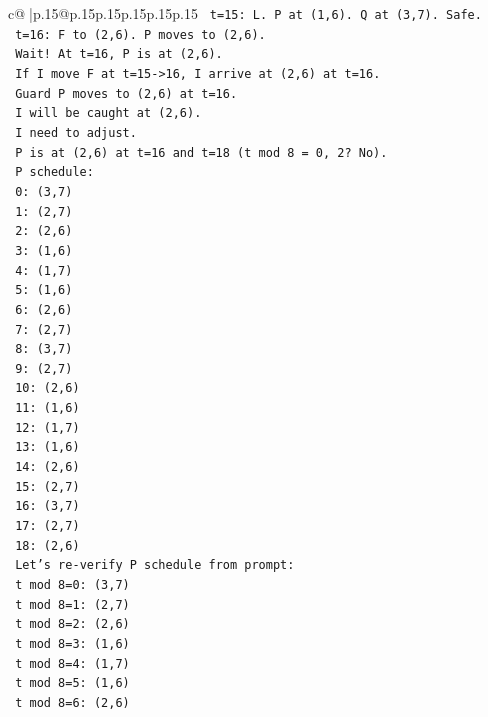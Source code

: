 \documentclass{article}
\begin{document}
{\begin{supertabular}{c@{$\;$}|p{.15\linewidth}@{}p{.15\linewidth}p{.15\linewidth}p{.15\linewidth}p{.15\linewidth}p{.15\linewidth}}
{{{\texttt{   t=15: L. P at (1,6). Q at (3,7). Safe.} \\
\texttt{   t=16: F to (2,6). P moves to (2,6).} \\
\texttt{     Wait! At t=16, P is at (2,6).} \\
\texttt{     If I move F at t=15{-}>16, I arrive at (2,6) at t=16.} \\
\texttt{     Guard P moves to (2,6) at t=16.} \\
\texttt{     I will be caught at (2,6).} \\
\texttt{   I need to adjust.} \\
\texttt{   P is at (2,6) at t=16 and t=18 (t mod 8 = 0, 2? No).} \\
\texttt{   P schedule:} \\
\texttt{   0: (3,7)} \\
\texttt{   1: (2,7)} \\
\texttt{   2: (2,6)} \\
\texttt{   3: (1,6)} \\
\texttt{   4: (1,7)} \\
\texttt{   5: (1,6)} \\
\texttt{   6: (2,6)} \\
\texttt{   7: (2,7)} \\
\texttt{   8: (3,7)} \\
\texttt{   9: (2,7)} \\
\texttt{   10: (2,6)} \\
\texttt{   11: (1,6)} \\
\texttt{   12: (1,7)} \\
\texttt{   13: (1,6)} \\
\texttt{   14: (2,6)} \\
\texttt{   15: (2,7)} \\
\texttt{   16: (3,7)} \\
\texttt{   17: (2,7)} \\
\texttt{   18: (2,6)} \\
\texttt{   Let's re{-}verify P schedule from prompt:} \\
\texttt{   t mod 8=0: (3,7)} \\
\texttt{   t mod 8=1: (2,7)} \\
\texttt{   t mod 8=2: (2,6)} \\
\texttt{   t mod 8=3: (1,6)} \\
\texttt{   t mod 8=4: (1,7)} \\
\texttt{   t mod 8=5: (1,6)} \\
\texttt{   t mod 8=6: (2,6)} \\
}}}
\end{supertabular}}
\end{document}
